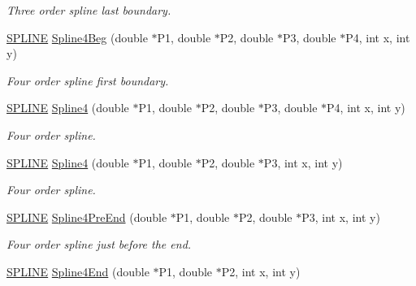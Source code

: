 \begin{DoxyCompactItemize}
\begin{DoxyCompactList}\small\item\em \-Three order spline last boundary. \end{DoxyCompactList}\item 
\hypertarget{classMatematica_a4166dfd1c333203677c8caf040ead05b}{\hyperlink{structSPLINE}{\-S\-P\-L\-I\-N\-E} \hyperlink{classMatematica_a4166dfd1c333203677c8caf040ead05b}{\-Spline4\-Beg} (double $\ast$\-P1, double $\ast$\-P2, double $\ast$\-P3, double $\ast$\-P4, int x, int y)}\label{classMatematica_a4166dfd1c333203677c8caf040ead05b}

\begin{DoxyCompactList}\small\item\em \-Four order spline first boundary. \end{DoxyCompactList}\item 
\hypertarget{classMatematica_a6b6c8217f2c75492c48cd60e4d9c17cf}{\hyperlink{structSPLINE}{\-S\-P\-L\-I\-N\-E} \hyperlink{classMatematica_a6b6c8217f2c75492c48cd60e4d9c17cf}{\-Spline4} (double $\ast$\-P1, double $\ast$\-P2, double $\ast$\-P3, double $\ast$\-P4, int x, int y)}\label{classMatematica_a6b6c8217f2c75492c48cd60e4d9c17cf}

\begin{DoxyCompactList}\small\item\em \-Four order spline. \end{DoxyCompactList}\item 
\hypertarget{classMatematica_aacb11b0728e0fbaaa3597c7e03b562c7}{\hyperlink{structSPLINE}{\-S\-P\-L\-I\-N\-E} \hyperlink{classMatematica_aacb11b0728e0fbaaa3597c7e03b562c7}{\-Spline4} (double $\ast$\-P1, double $\ast$\-P2, double $\ast$\-P3, int x, int y)}\label{classMatematica_aacb11b0728e0fbaaa3597c7e03b562c7}

\begin{DoxyCompactList}\small\item\em \-Four order spline. \end{DoxyCompactList}\item 
\hypertarget{classMatematica_a0b3e535c3c50459ad85fbb27d8ab0ca3}{\hyperlink{structSPLINE}{\-S\-P\-L\-I\-N\-E} \hyperlink{classMatematica_a0b3e535c3c50459ad85fbb27d8ab0ca3}{\-Spline4\-Pre\-End} (double $\ast$\-P1, double $\ast$\-P2, double $\ast$\-P3, int x, int y)}\label{classMatematica_a0b3e535c3c50459ad85fbb27d8ab0ca3}

\begin{DoxyCompactList}\small\item\em \-Four order spline just before the end. \end{DoxyCompactList}\item 
\hypertarget{classMatematica_a13fad8c692fb52f3ccd8a5f47b7db2cb}{\hyperlink{structSPLINE}{\-S\-P\-L\-I\-N\-E} \hyperlink{classMatematica_a13fad8c692fb52f3ccd8a5f47b7db2cb}{\-Spline4\-End} (double $\ast$\-P1, double $\ast$\-P2, int x, int y)}\label{classMatematica_a13fad8c692fb52f3ccd8a5f47b7db2cb}


\end{DoxyCompactItemize}
